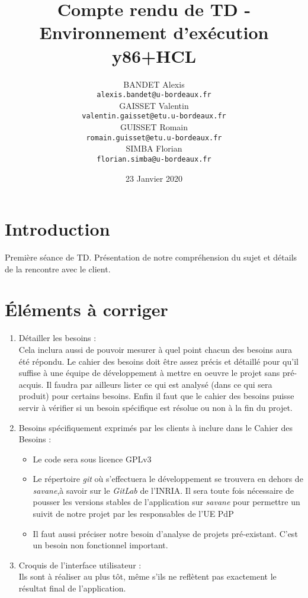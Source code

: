 \documentclass[french]{article}
\title{Compte rendu de TD - Environnement d'exécution y86+HCL}
\author{
    BANDET Alexis \\
    \texttt{alexis.bandet@u-bordeaux.fr} \\
    GAISSET Valentin \\
    \texttt{valentin.gaisset@etu.u-bordeaux.fr} \\
    GUISSET Romain \\
    \texttt{romain.guisset@etu.u-bordeaux.fr} \\
    SIMBA Florian \\
    \texttt{florian.simba@u-bordeaux.fr} \\
}
\date{23 Janvier 2020}
\begin{document}
\maketitle

\section{Introduction}

Première séance de TD. Présentation de notre compréhension du sujet et détails de la rencontre avec le client. 

\section{Éléments à corriger}

\begin{enumerate}
    \item Détailler les besoins :\\
    Cela inclura aussi de pouvoir mesurer à quel point chacun des besoins aura été répondu. Le cahier des besoins doit être assez précis et détaillé pour qu'il suffise à une équipe de développement à mettre en oeuvre le projet sans pré-acquis.
    Il faudra par ailleurs lister ce qui est analysé (dans ce qui sera produit) pour certains besoins. Enfin il faut que le cahier des besoins puisse servir à vérifier si un besoin spécifique est résolue ou non à la fin du projet. 
    \\
    \item Besoins spécifiquement exprimés par les clients à inclure dans le Cahier des Besoins :
    \begin{itemize}
        \item Le code sera sous licence GPLv3
        
        \item Le répertoire \textit{git} où s'effectuera le développement se trouvera en dehors de \textit{savane},à savoir sur le \textit{GitLab} de l'INRIA. Il sera toute fois nécessaire de pousser les versions stables de l'application sur \textit{savane} pour permettre un suivit de notre projet par les responsables de l'UE PdP
        
        \item Il faut aussi préciser notre besoin d'analyse de projets pré-existant. C'est un besoin non fonctionnel important.
    \end{itemize}
    
    \item Croquis de l'interface utilisateur :\\
    Ils sont à réaliser au plus tôt, même s'ils ne reflètent pas exactement le résultat final de l'application.
    
\end{enumerate}

\end{document}
